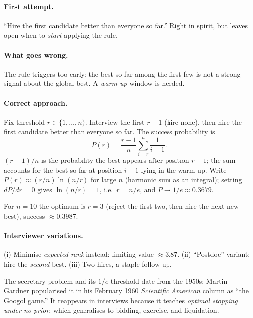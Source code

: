 \paragraph{First attempt.}
``Hire the first candidate better than everyone so far.''  Right
in spirit, but leaves open when to \emph{start} applying the rule.

\paragraph{What goes wrong.}
The rule triggers too early: the best-so-far among the first few
is not a strong signal about the global best.  A \emph{warm-up}
window is needed.

\paragraph{Correct approach.}
Fix threshold $r \in \{1, \dots, n\}$.  Interview the first $r-1$
(hire none), then hire the first candidate better than everyone so
far.  The success probability is
\[
P(r)
= \frac{r-1}{n} \sum_{i=r}^{n} \frac{1}{i-1}.
\]
$(r-1)/n$ is the probability the best appears after position
$r-1$; the sum accounts for the best-so-far at position $i-1$
lying in the warm-up.  Write $P(r) \approx (r/n) \ln(n/r)$ for
large $n$ (harmonic sum as an integral); setting $dP/dr = 0$
gives $\ln(n/r) = 1$, i.e.\ $r = n/e$, and $P \to 1/e \approx
0.3679$.

For $n = 10$ the optimum is $r = 3$ (reject the first two, then
hire the next new best), success $\approx 0.3987$.

\paragraph{Interviewer variations.}
(i) Minimise \emph{expected rank} instead: limiting value
$\approx 3.87$.  (ii) ``Postdoc'' variant: hire the \emph{second}
best.  (iii) Two hires, a staple follow-up.

\begin{historybox}[title={The 1/e law}]
The secretary problem and its $1/e$ threshold date from the 1950s;
Martin Gardner popularised it in his February 1960 \emph{Scientific
American} column as ``the Googol game.''  It reappears in
interviews because it teaches \emph{optimal stopping under no
prior}, which generalises to bidding, exercise, and liquidation.
\end{historybox}

